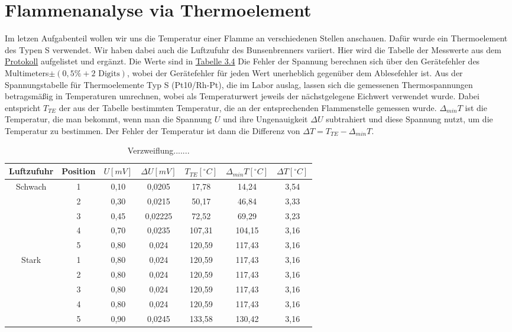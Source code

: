 \section{Flammenanalyse via Thermoelement}
Im letzen Aufgabenteil wollen wir uns die Temperatur einer Flamme an verschiedenen Stellen anschauen. Dafür wurde ein Thermoelement des Typen S verwendet. 
Wir haben dabei auch die Luftzufuhr des Bunsenbrenners variiert. Hier wird die Tabelle der Messwerte aus dem \hyperref[Protokoll]{Protokoll} aufgelistet und ergänzt. Die Werte sind in \hyperref[tab:letzte_tabelle_aus_diesem_doofen_versuch_ich_will_wirklcih_nicht_mehr_HILFE]{Tabelle 3.4}
Die Fehler der Spannung berechnen sich über den Gerätefehler des Multimeters$\pm (0,5\% + 2 \text{ Digits})$,
wobei der Gerätefehler für jeden Wert unerheblich gegenüber dem Ablesefehler ist.
Aus der Spannungstabelle für Thermoelemente Typ S (Pt10/Rh-Pt), die im Labor auslag, lassen sich die gemessenen Thermospannungen betragsmäßig in Temperaturen umrechnen, wobei als Temperaturwert jeweils der nächstgelegene Eichwert verwendet wurde.
Dabei entspricht $T_{TE}$ der aus der Tabelle bestimmten Temperatur, die an der entsprechenden Flammenstelle gemessen wurde. 
$\Delta_{min} T$ ist die Temperatur, die man bekommt, wenn man die Spannung $U$ und ihre Ungenauigkeit $\Delta U$ subtrahiert und diese Spannung nutzt, um die Temperatur zu bestimmen.
Der Fehler der Temperatur ist dann die Differenz von $\Delta T = T_{TE} - \Delta_{min} T$.

\begin{table}[h!]
    \centering
    \caption{Verzweiflung.......}
    \label{tab:letzte_tabelle_aus_diesem_doofen_versuch_ich_will_wirklcih_nicht_mehr_HILFE}
    \begin{tabular}{c | c | c | c | c | c | c}
        \toprule
        Luftzufuhr & Position & $U [mV]$ & $\Delta U [mV]$ & $T_{TE} [^\circ C]$ & $\Delta_{min} T [^\circ C]$ & $\Delta T [^\circ C]$ \\
        \midrule
        Schwach & 1 & 0,10 & 0,0205 & 17,78 & 14,24 & 3,54\\
                & 2 & 0,30 & 0,0215 & 50,17 & 46,84 & 3,33 \\
                & 3 & 0,45 & 0,02225 & 72,52 & 69,29 & 3,23\\
                & 4 & 0,70 & 0,0235 & 107,31 & 104,15 & 3,16 \\
                & 5 & 0,80 & 0,024 & 120,59 & 117,43 & 3,16 \\
        \hline
        Stark   & 1 & 0,80 & 0,024 & 120,59 & 117,43 & 3,16 \\
                & 2 & 0,80 & 0,024 & 120,59 & 117,43 & 3,16 \\
                & 3 & 0,80 & 0,024 & 120,59 & 117,43 & 3,16 \\
                & 4 & 0,80 & 0,024 & 120,59 & 117,43 & 3,16 \\
                & 5 & 0,90 & 0,0245 & 133,58 & 130,42 & 3,16 \\
        \bottomrule
    \end{tabular}
\end{table}

